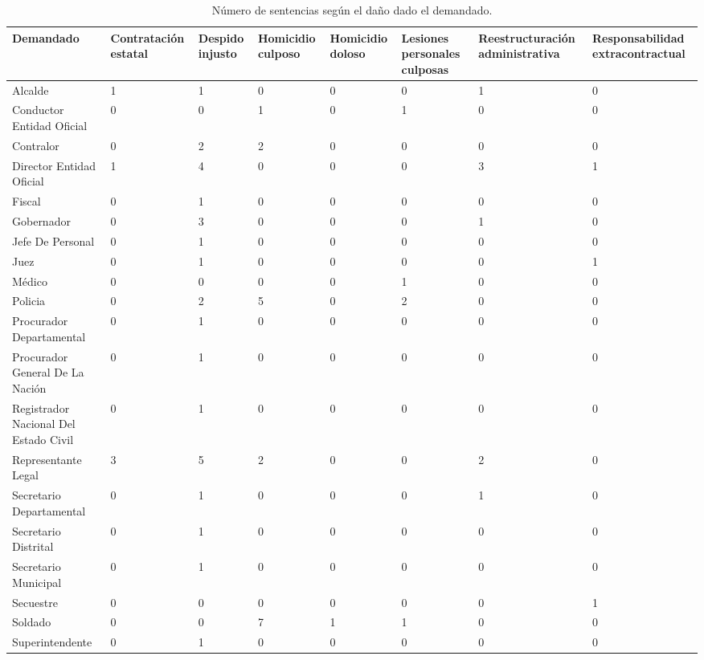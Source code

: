 \begin{sidewaystable}[!htbp]
\centering
\caption{Número de sentencias según el daño dado el demandado.} 
\label{tab:danodemandado}
\begin{tabular}{p{5cm}R{2cm}R{2cm}R{2cm}R{2cm}R{2cm}R{2cm}R{2cm}}
  \hline
Demandado & Contratación estatal & Despido injusto & Homicidio culposo & Homicidio doloso & Lesiones personales culposas & Reestructuración administrativa & Responsabilidad extracontractual \\ 
  \hline
Alcalde &  1 &  1 &  0 &  0 &  0 &  1 &  0 \\ 
  Conductor Entidad Oficial &  0 &  0 &  1 &  0 &  1 &  0 &  0 \\ 
  Contralor &  0 &  2 &  2 &  0 &  0 &  0 &  0 \\ 
  Director Entidad Oficial &  1 &  4 &  0 &  0 &  0 &  3 &  1 \\ 
  Fiscal &  0 &  1 &  0 &  0 &  0 &  0 &  0 \\ 
  Gobernador &  0 &  3 &  0 &  0 &  0 &  1 &  0 \\ 
  Jefe De Personal &  0 &  1 &  0 &  0 &  0 &  0 &  0 \\ 
  Juez &  0 &  1 &  0 &  0 &  0 &  0 &  1 \\ 
  Médico &  0 &  0 &  0 &  0 &  1 &  0 &  0 \\ 
  Policia &  0 &  2 &  5 &  0 &  2 &  0 &  0 \\ 
  Procurador Departamental &  0 &  1 &  0 &  0 &  0 &  0 &  0 \\ 
  Procurador General De La Nación &  0 &  1 &  0 &  0 &  0 &  0 &  0 \\ 
  Registrador Nacional Del Estado Civil &  0 &  1 &  0 &  0 &  0 &  0 &  0 \\ 
  Representante Legal &  3 &  5 &  2 &  0 &  0 &  2 &  0 \\ 
  Secretario Departamental &  0 &  1 &  0 &  0 &  0 &  1 &  0 \\ 
  Secretario Distrital &  0 &  1 &  0 &  0 &  0 &  0 &  0 \\ 
  Secretario Municipal &  0 &  1 &  0 &  0 &  0 &  0 &  0 \\ 
  Secuestre &  0 &  0 &  0 &  0 &  0 &  0 &  1 \\ 
  Soldado &  0 &  0 &  7 &  1 &  1 &  0 &  0 \\ 
  Superintendente &  0 &  1 &  0 &  0 &  0 &  0 &  0 \\ 
   \hline
\end{tabular}
\end{sidewaystable}
